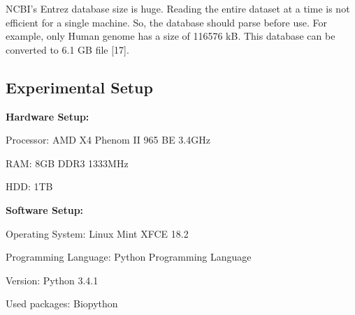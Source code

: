 \documentclass[preprint,12pt]{elsarticle}
\begin{document}
NCBI's Entrez database size is huge. Reading the entire dataset at a time is not efficient for a single machine. So, the database should parse before use. For example, only Human genome has a size of 116576 kB. This database can be converted to 6.1 GB file [17].
 


\subsection{Experimental Setup}
    
\textbf{Hardware Setup:} 

Processor:  AMD X4 Phenom II 965 BE 3.4GHz

RAM: 8GB DDR3 1333MHz

HDD: 1TB


\textbf{Software Setup:}

Operating System: Linux Mint XFCE 18.2

Programming Language: Python Programming Language

Version: Python 3.4.1

Used packages: Biopython
\end{document}
